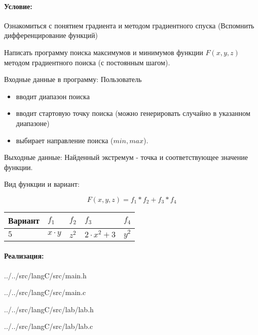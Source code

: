 \paragraph{Условие:} \hspace{0pt}

Ознакомиться с понятием градиента и методом градиентного спуска (Вспомнить дифференцирование функций)

Написать программу поиска максимумов и минимумов функции $F(x,y,z)$ методом градиентного поиска (с постоянным шагом).

Входные данные в программу: Пользователь 
\begin{itemize}
    \item вводит диапазон поиска
    \item вводит стартовую точку поиска (можно генерировать случайно в указанном диапазоне)
    \item выбирает направление поиска ($min, max$).
\end{itemize}

Выходные данные: Найденный экстремум - точка и соответствующее значение функции.

Вид функции и вариант:

$$F(x,y,z) = f_1*f_2 + f_3*f_4$$

\begin{center}
    \begin{tabular}{ | l | l | l | l | l | }
        \hline
        Вариант & $f_1$ & $f_2$ & $f_3$ & $f_4$ \\
        \hline
        $5$ & $x \cdot y$ & $z^2$ & $2 \cdot x^2 + 3$ & $y^2$ \\
        \hline
    \end{tabular}
\end{center}


\paragraph{Реализация:} \hspace{0pt}



{../../src/langC/src/main.h}


{../../src/langC/src/main.c}



{../../src/langC/src/lab/lab.h}


{../../src/langC/src/lab/lab.c}



